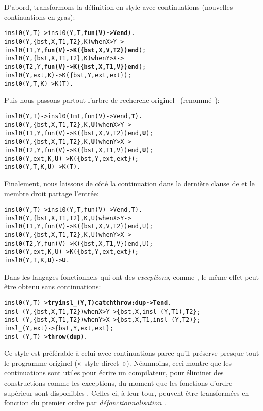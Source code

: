 D'abord, transformons la définition en style avec continuations
(nouvelles continuations en gras):
\begin{alltt}
insl0(Y,T)               -> insl0(Y,T,\textbf{fun(V) -> V end}).
insl0(Y,\{bst,X,T1,T2\},K) when X > Y ->
\hfill{}insl0(T1,Y,\textbf{fun(V) -> K(\{bst,X,V,T2\}) end});
insl0(Y,\{bst,X,T1,T2\},K) when Y > X ->
\hfill{}insl0(T2,Y,\textbf{fun(V) -> K(\{bst,X,T1,V\}) end});
insl0(Y,          ext,K) -> K(\{bst,Y,ext,ext\});
insl0(Y,            T,K) -> K(T).
\end{alltt}
Puis nous passons partout l'arbre de recherche originel~
(renommé~):
\begin{alltt}
insl0(Y,T)                 -> insl0(TmT,fun(V) -> V end,\textbf{T}).
insl0(Y,\{bst,X,T1,T2\},K,\textbf{U}) when X > Y ->
\hfill{}insl0(T1,Y,fun(V) -> K(\{bst,X,V,T2\}) end,\textbf{U});
insl0(Y,\{bst,X,T1,T2\},K,\textbf{U}) when Y > X ->
\hfill{}insl0(T2,Y,fun(V) -> K(\{bst,X,T1,V\}) end,\textbf{U});
insl0(Y,          ext,K,\textbf{U}) -> K(\{bst,Y,ext,ext\});
insl0(Y,            T,K,\textbf{U}) -> K(T).
\end{alltt}
Finalement, nous laissons de côté la continuation dans la dernière
clause de  et le membre droit partage l'entrée:
\begin{alltt}
insl0(Y,T)                 -> insl0(Y,T,fun(V) -> V end,T).
insl0(Y,\{bst,X,T1,T2\},K,U) when X > Y ->
\hfill{}insl0(T1,Y,fun(V) -> K(\{bst,X,V,T2\}) end,U);
insl0(Y,\{bst,X,T1,T2\},K,U) when Y > X ->
\hfill{}insl0(T2,Y,fun(V) -> K(\{bst,X,T1,V\}) end,U);
insl0(Y,          ext,K,U) -> K(\{bst,Y,ext,ext\});
insl0(Y,            T,K,\textbf{U}) -> \textbf{U}.\hfill% \emph{Entrée partagée}
\end{alltt}
Dans les langages fonctionnels qui ont des
\emph{exceptions},
comme \Erlang, le même effet peut être obtenu sans continuations:
\begin{alltt}
insl0(Y,T)\hfill{}-> \textbf{try insl\_(Y,T) catch throw:dup -> T end}.
insl\_(Y,\{bst,X,T1,T2\}) when X > Y -> \{bst,X,insl\_(Y,T1),T2\};
insl\_(Y,\{bst,X,T1,T2\}) when Y > X -> \{bst,X,T1,insl\_(Y,T2)\};
insl\_(Y,          ext)            -> \{bst,Y,ext,ext\};
insl\_(Y,            T)            -> \textbf{throw(dup)}.
\end{alltt}
Ce style est préférable à celui avec continuations parce qu'il
préserve presque tout le programme originel («~style
direct~»). Néanmoins, ceci montre que les continuations sont utiles
pour écrire un compilateur, pour éliminer des constructions comme les
exceptions, du moment que les fonctions d'ordre supérieur sont
disponibles \citep{Appel_1992}. Celles-ci, à leur tour, peuvent être
transformées en fonction du premier ordre par
\emph{défonctionnalisation}
\citep{Reynolds_1972,DanvyNielsen_2001}.

